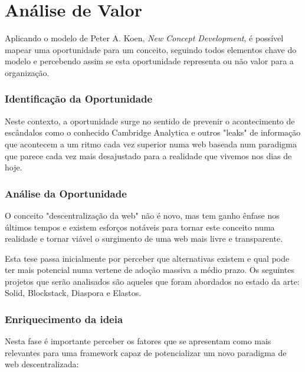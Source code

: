 \chapter{Análise de Valor}
\label{cap:3}

Aplicando o modelo de Peter A. Koen, \emph{New Concept Development}, é possível mapear uma oportunidade para um conceito, seguindo todos elementos chave do modelo e percebendo assim
se esta oportunidade representa ou não valor para a organização.

\subsection{Identificação da Oportunidade}
Neste contexto, a oportunidade surge no sentido de prevenir o acontecimento de escândalos como o conhecido Cambridge Analytica e outros "leaks" \cite{cambridge_analytica} de informação que acontecem a um ritmo cada vez superior numa web baseada num paradigma que parece cada vez mais desajustado para a realidade que vivemos nos dias de hoje.

\subsection{Análise da Oportunidade}
O conceito "descentralização da web" não é novo, mas tem ganho ênfase nos últimos tempos e existem esforços notáveis para tornar este conceito numa realidade e tornar viável o surgimento de uma web mais livre e transparente.

Esta tese passa inicialmente por perceber que alternativas existem e qual pode ter mais potencial numa vertene de adoção massiva a médio prazo. Os seguintes projetos que serão analisados são aqueles que foram abordados no estado da arte: Solid, Blockstack, Diaspora e Elastos.

\subsection{Enriquecimento da ideia}
Nesta fase é importante perceber os fatores que se apresentam como mais relevantes para uma framework capaz de potencializar um novo paradigma de web descentralizada:

